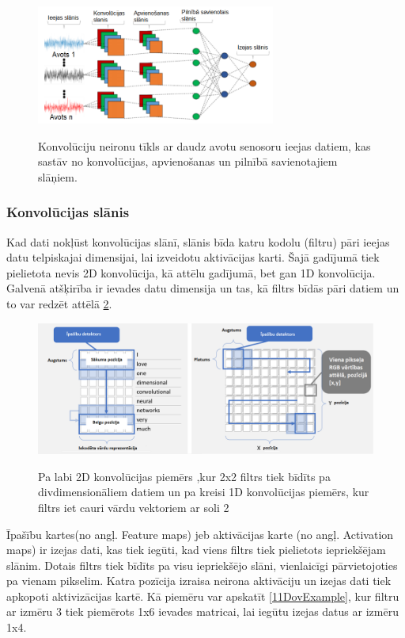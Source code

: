 \documentclass[12pt,paper=A4]{report}
\begin{document}
\begin{figure}[H] \centering
\includegraphics[width=0.70\textwidth]{humanCNN} 
\caption{Konvolūciju neironu tīkls ar daudz avotu senosoru ieejas datiem, kas sastāv no konvolūcijas, apvienošanas un pilnībā savienotajiem slāņiem.}
\cite{inproceeding12}
\label{arherg} 
\end{figure}


\subsubsection{Konvolūcijas slānis}
Kad dati nokļūst konvolūcijas slānī, slānis bīda katru kodolu (filtru) pāri ieejas datu telpiskajai dimensijai, lai izveidotu aktivācijas karti. Šajā gadījumā tiek pielietota nevis 2D konvolūcija, kā attēlu gadījumā, bet gan 1D konvolūcija. Galvenā atšķirība ir ievades datu dimensija un tas, kā filtrs bīdās pāri datiem un to var redzēt attēlā \ref{1dconv}.

\begin{figure}[H] \centering
\includegraphics[width=1.00\textwidth]{1DConv} \caption{Pa labi 2D konvolūcijas piemērs ,kur 2x2 filtrs tiek bīdīts pa divdimensionāliem datiem un pa kreisi 1D konvolūcijas piemērs, kur filtrs iet cauri vārdu vektoriem ar soli 2} \cite{lim2017rare}  
\label{1dconv} 
\end{figure}

Īpašību kartes(no angļ. Feature maps) jeb aktivācijas karte (no angļ. Activation maps) ir izejas dati, kas tiek iegūti, kad viens filtrs tiek pielietots iepriekšējam slānim. Dotais filtrs tiek bīdīts pa visu iepriekšējo slāni, vienlaicīgi pārvietojoties pa vienam pikselim. Katra pozīcija izraisa neirona aktivāciju un izejas dati tiek apkopoti aktivizācijas kartē. Kā piemēru var apskatīt \ref{11DovExample}, kur filtru ar izmēru 3 tiek piemērots 1x6 ievades matricai, lai iegūtu izejas datus ar izmēru 1x4. 
\end{document}
